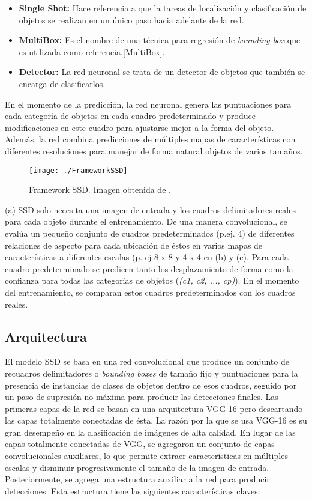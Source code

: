 \documentclass[a4paper, 12pt, spanish, chapterprefix, numbers=noenddot]{book}
\begin{document}
\begin{itemize}
\item \textbf{Single Shot:}  Hace referencia a que la tareas de localización y clasificación de objetos se realizan en un único paso hacia adelante de la red.
\item \textbf{MultiBox:} Es el nombre de una técnica para regresión de \textit{bounding box} que es utilizada como referencia.\ref{MultiBox}.
\item \textbf{Detector:} La red neuronal se trata de un detector de objetos que también se encarga de clasificarlos.
\end{itemize}

En el momento de la predicción, la red neuronal genera las puntuaciones para cada categoría de objetos en cada cuadro predeterminado y produce modificaciones en este cuadro para ajustarse mejor a la forma del objeto. Además, la red combina predicciones de múltiples mapas de características con diferentes resoluciones para manejar de forma natural objetos de varios tamaños. 

\begin{figure}[H]
\begin{center}
\texttt{[image: ./FrameworkSSD]}
\caption{Framework SSD. Imagen obtenida de \cite{SSD}.}
\label{FrameworkSSD}
\end{center}
\end{figure}

(a) SSD solo necesita una imagen de entrada y los cuadros delimitadores reales para cada objeto durante el entrenamiento. De una manera convolucional, se evalúa un pequeño conjunto de cuadros predeterminados (p.ej. 4) de diferentes relaciones de aspecto para cada ubicación de éstos en varios mapas de características a diferentes escalas (p. ej 8 x 8 y 4 x 4 en (b) y (c). Para cada cuadro predeterminado se predicen tanto los desplazamiento de forma como la confianza para todas las categorías de objetos (\textit{(c1, c2, ..., cp)}). En el momento del entrenamiento, se comparan estos cuadros predeterminados con los cuadros reales.

\subsection{Arquitectura}\label{ArquitecturaSSDSection}

El modelo SSD se basa en una red convolucional que produce un conjunto de recuadros delimitadores o \textit{bounding boxes} de tamaño fijo y puntuaciones para la presencia de instancias de clases de objetos dentro de esos cuadros, seguido por un paso de supresión no máxima para producir las detecciones finales. Las primeras capas de la red se basan en una arquitectura VGG-16\cite{VGG} pero descartando las capas totalmente conectadas de ésta. La razón por la que se usa VGG-16 es su gran desempeño en la clasificación de imágenes de alta calidad. En lugar de las capas totalmente conectadas de VGG, se agregaron un conjunto de capas convolucionales auxiliares, lo que permite extraer características en múltiples escalas y disminuir progresivamente el tamaño de la imagen de entrada. Posteriormente, se agrega una estructura auxiliar a la red para producir detecciones. Esta estructura tiene las siguientes características claves:
\end{document}
